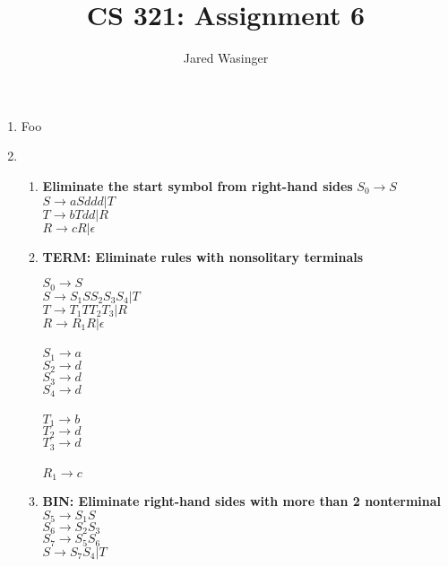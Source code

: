 \documentclass{article}
\begin{document}
  \title{CS 321: Assignment 6}
  \author{Jared Wasinger}

  \maketitle

	\begin{enumerate}
		\item Foo
		
		\item \begin{enumerate}
			$S \rightarrow aSddd | T$\\
			$T \rightarrow bTdd | R$\\
			$R \rightarrow cR | \epsilon$\\
			\item \textbf{Eliminate the start symbol from right-hand sides}
				$S_0 \rightarrow S$\\
				$S \rightarrow aSddd | T$\\
				$T \rightarrow bTdd | R$\\
				$R \rightarrow cR | \epsilon$\\
			\item \textbf{TERM: Eliminate rules with nonsolitary terminals}
				
				$S_0 \rightarrow S$\\
				$S \rightarrow S_1SS_2S_3S_4 | T$\\
				$T \rightarrow T_1TT_2T_3 | R$\\
				$R \rightarrow R_1R | \epsilon$\\\\
				$S_1 \rightarrow a$\\
				$S_2 \rightarrow d$\\$S_3 \rightarrow d$\\$S_4 \rightarrow d$\\\\
				$T_1 \rightarrow b$\\ $T_2 \rightarrow d$\\$T_3 \rightarrow d$\\\\
				$R_1 \rightarrow c$\\
				
			\item \textbf{BIN: Eliminate right-hand sides with more than 2 nonterminal }
				$S_5 \rightarrow S_1S$\\
				$S_6 \rightarrow S_2S_3$\\
				$S_7 \rightarrow S_5S_6$\\
				$S \rightarrow S_7S_4 | T$\\


\end{enumerate}
\end{enumerate}
\end{document}
